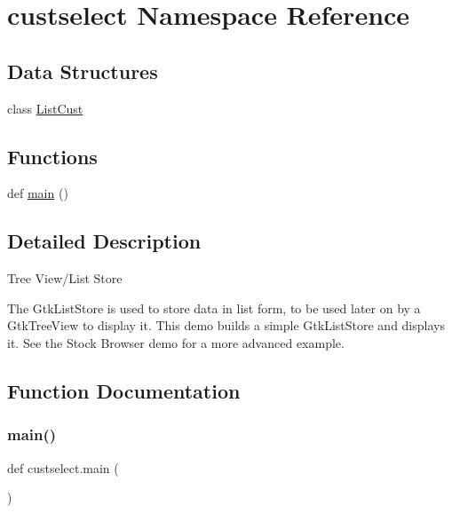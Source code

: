 \hypertarget{namespacecustselect}{}\section{custselect Namespace Reference}
\label{namespacecustselect}
\subsection*{Data Structures}
\begin{DoxyCompactItemize}
\item 
class \hyperlink{classcustselect_1_1_list_cust}{List\+Cust}
\end{DoxyCompactItemize}
\subsection*{Functions}
\begin{DoxyCompactItemize}
\item 
def \hyperlink{namespacecustselect_a8e777dbca0c27448527c600614206ee2}{main} ()
\end{DoxyCompactItemize}


\subsection{Detailed Description}
\begin{DoxyVerb}Tree View/List Store

The GtkListStore is used to store data in list form, to be used
later on by a GtkTreeView to display it. This demo builds a
simple GtkListStore and displays it. See the Stock Browser
demo for a more advanced example.\end{DoxyVerb}
 

\subsection{Function Documentation}
\mbox{\label{namespacecustselect_a8e777dbca0c27448527c600614206ee2}} 
\subsubsection{\texorpdfstring{main()}{main()}}
{\footnotesize\ttfamily def custselect.\+main (\begin{DoxyParamCaption}{ }\end{DoxyParamCaption})}

